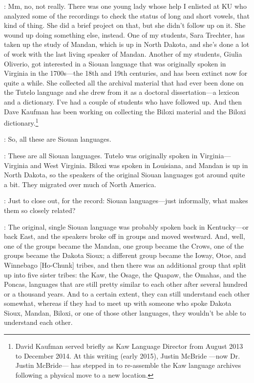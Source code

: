 \documentclass[output=paper]{LSP/langsci}
\begin{document}
: Mm, no, not really. There was one young lady whose help I enlisted at KU who analyzed some of the recordings to check the status of long and short vowels, that kind of thing. She did a brief project on that, but she didn't follow up on it. She wound up doing something else, instead. One of my students, Sara Trechter, has taken up the study of Mandan, which is up in North Dakota, and she's done a lot of work with the last living speaker of Mandan. Another of my students, Giulia Oliverio, got interested in a Siouan language that was originally spoken in Virginia in the 1700s---the 18th and 19th centuries, and has been extinct now for quite a while. She collected all the archival material that had ever been done on the Tutelo language and she drew from it as a doctoral dissertation---a lexicon and a dictionary. I've had a couple of students who have followed up. And then Dave Kaufman has been working on collecting the Biloxi material and the Biloxi dictionary.\footnote{David Kaufman served briefly as Kaw Language Director from August 2013 to December 2014. At this writing (early 2015), Justin McBride ---now Dr. Justin McBride--- has stepped in to re-assemble the Kaw language archives following a physical move to a new location.}

: So, all these are Siouan languages.

: These are all Siouan languages. Tutelo was originally spoken in Virginia---Virginia and West Virginia. Biloxi was spoken in Louisiana, and Mandan is up in North Dakota, so the speakers of the original Siouan languages got around quite a bit. They migrated over much of North America.

: Just to close out, for the record: Siouan languages---just informally, what makes them so closely related?

: The original, single Siouan language was probably spoken back in Kentucky---or back East, and the speakers broke off in groups and moved westward. And, well, one of the groups became the Mandan, one group became the Crows, one of the groups became the Dakota Sioux; a different group became the Ioway, Otoe, and Winnebago [Ho-Chunk] tribes, and then there was an additional group that split up into five sister tribes: the Kaw, the Osage, the Quapaw, the Omahas, and the Poncas, languages that are still pretty similar to each other after several hundred or a thousand years. And to a certain extent, they can still understand each other somewhat, whereas if they had to meet up with someone who spoke Dakota Sioux, Mandan, Biloxi, or one of those other languages, they wouldn't be able to understand each other.
\end{document}

